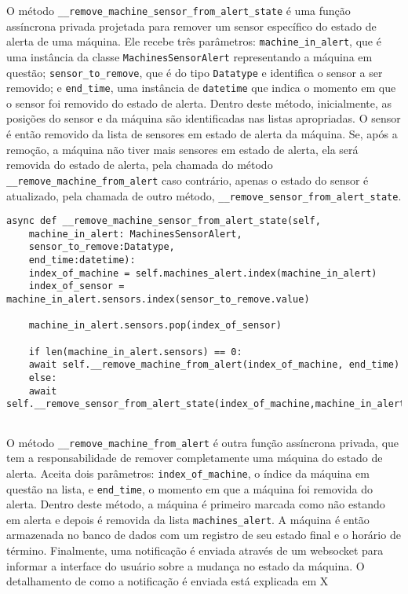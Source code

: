 O método \texttt{\_\_remove\_machine\_sensor\_from\_alert\_state} é uma função assíncrona privada projetada para remover um sensor específico do estado de alerta de uma máquina. Ele recebe três parâmetros: \texttt{machine\_in\_alert}, que é uma instância da classe \texttt{MachinesSensorAlert} representando a máquina em questão; \texttt{sensor\_to\_remove}, que é do tipo \texttt{Datatype} e identifica o sensor a ser removido; e \texttt{end\_time}, uma instância de \texttt{datetime} que indica o momento em que o sensor foi removido do estado de alerta. Dentro deste método, inicialmente, as posições do sensor e da máquina são identificadas nas listas apropriadas. O sensor é então removido da lista de sensores em estado de alerta da máquina. Se, após a remoção, a máquina não tiver mais sensores em estado de alerta, ela será removida do estado de alerta, pela chamada do método \texttt{\_\_remove\_machine\_from\_alert} caso contrário, apenas o estado do sensor é atualizado, pela chamada de outro método, \texttt{\_\_remove\_sensor\_from\_alert\_state}.

\begin{verbatim}
async def __remove_machine_sensor_from_alert_state(self,
    machine_in_alert: MachinesSensorAlert,
    sensor_to_remove:Datatype,
    end_time:datetime):
    index_of_machine = self.machines_alert.index(machine_in_alert)
    index_of_sensor = machine_in_alert.sensors.index(sensor_to_remove.value)
    
    machine_in_alert.sensors.pop(index_of_sensor)
    
    if len(machine_in_alert.sensors) == 0:
    await self.__remove_machine_from_alert(index_of_machine, end_time)
    else:
    await self.__remove_sensor_from_alert_state(index_of_machine,machine_in_alert)
    
\end{verbatim}

O método \texttt{\_\_remove\_machine\_from\_alert} é outra função assíncrona privada, que tem a responsabilidade de remover completamente uma máquina do estado de alerta. Aceita dois parâmetros: \texttt{index\_of\_machine}, o índice da máquina em questão na lista, e \texttt{end\_time}, o momento em que a máquina foi removida do alerta. Dentro deste método, a máquina é primeiro marcada como não estando em alerta e depois é removida da lista \texttt{machines\_alert}. A máquina é então armazenada no banco de dados com um registro de seu estado final e o horário de término. Finalmente, uma notificação é enviada através de um websocket para informar a interface do usuário sobre a mudança no estado da máquina. O detalhamento de como a notificação é enviada está explicada em X %

